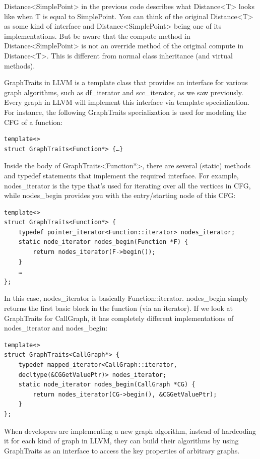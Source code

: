 Distance<SimplePoint> in the previous code describes what Distance<T> looks like when T is equal to SimplePoint. You can think of the original Distance<T> as some kind of interface and Distance<SimplePoint> being one of its implementations. But be aware that the compute method in  Distance<SimplePoint> is not an override method of the original compute in Distance<T>. This is different from normal class inheritance (and virtual methods). 

GraphTraits in LLVM is a template class that provides an interface for various graph algorithms, such as df\_iterator and scc\_iterator, as we saw previously. Every graph in LLVM will implement this interface via template specialization. For instance, the following GraphTraits specialization is used for modeling the CFG of a function:

\begin{lstlisting}[style=styleCXX]
template<>
struct GraphTraits<Function*> {…}
\end{lstlisting}

Inside the body of GraphTraits<Function*>, there are several (static) methods and typedef statements that implement the required interface. For example, nodes\_iterator is the type that's used for iterating over all the vertices in CFG, while nodes\_begin provides you with the entry/starting node of this CFG:

\begin{lstlisting}[style=styleCXX]
template<>
struct GraphTraits<Function*> {
	typedef pointer_iterator<Function::iterator> nodes_iterator;
	static node_iterator nodes_begin(Function *F) {
		return nodes_iterator(F->begin());
	}
	…
};
\end{lstlisting}

In this case, nodes\_iterator is basically Function::iterator. nodes\_begin simply returns the first basic block in the function (via an iterator). If we look at GraphTraits for CallGraph, it has completely different implementations of nodes\_iterator and nodes\_begin:

\begin{lstlisting}[style=styleCXX]
template<>
struct GraphTraits<CallGraph*> {
	typedef mapped_iterator<CallGraph::iterator,
	decltype(&CGGetValuePtr)> nodes_iterator;
	static node_iterator nodes_begin(CallGraph *CG) {
		return nodes_iterator(CG->begin(), &CGGetValuePtr);
	}
};
\end{lstlisting}

When developers are implementing a new graph algorithm, instead of hardcoding it for each kind of graph in LLVM, they can build their algorithms by using GraphTraits as an interface to access the key properties of arbitrary graphs.

